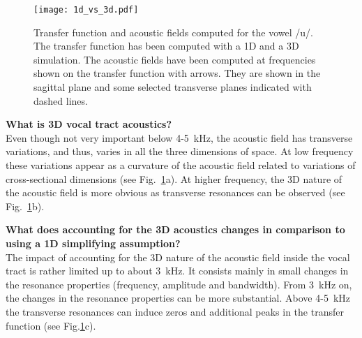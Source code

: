 \documentclass[]{article}
\begin{document}
	\begin{figure}
		\centering
		\texttt{[image: 1d\_vs\_3d.pdf]}
		\caption{Transfer function and acoustic fields computed for the vowel /u/.
			The transfer function has been computed with a 1D and a 3D simulation. The acoustic fields have been computed at frequencies shown on the transfer function with arrows.
			They are shown in the sagittal plane and some selected transverse planes  
			indicated with dashed lines.}
		\label{figure:1d_vs_3d}
	\end{figure}
	
	\textbf{What is 3D vocal tract acoustics?}\\
	Even though not very important below 4-5~kHz, 
	the acoustic field has transverse variations, and thus, varies in
	all the three dimensions of space. At low frequency these variations
	appear as a curvature of the acoustic field related to variations
	of cross-sectional dimensions (see Fig.~\ref{figure:1d_vs_3d}a). At higher frequency, the 3D nature of the acoustic field is more obvious as transverse resonances can be observed
	(see Fig.~\ref{figure:1d_vs_3d}b).
	
	\textbf{What does accounting for the 3D acoustics changes in comparison to using a 1D simplifying assumption?}\\
	The impact of accounting for the 3D nature of the acoustic field 
	inside the vocal tract is rather limited up to about 3~kHz. 
	It consists mainly in small changes in the resonance properties
	(frequency, amplitude and bandwidth). From 3~kHz on, the changes 
	in the resonance properties can be more substantial. Above 
	4-5~kHz the transverse resonances can induce zeros and additional 
	peaks in the transfer function (see Fig.\ref{figure:1d_vs_3d}c). 
	
	
\end{document}
